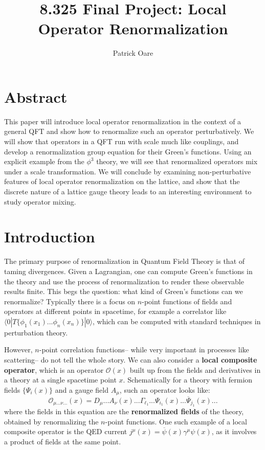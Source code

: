 \documentclass[11pt, oneside]{article}   	%
\title{8.325 Final Project: Local Operator Renormalization}
\author{Patrick Oare}
\date{}							%
\theoremstyle{definition}
\begin{document}
\maketitle

\thispagestyle{empty}

\section*{Abstract}

This paper will introduce local operator renormalization in the context of a general QFT and show how to renormalize 
such an operator perturbatively. We will show that operators in a QFT run with scale much like couplings, and develop 
a renormalization group equation for their Green's functions. Using an explicit example from the $\phi^3$ theory, 
we will see that renormalized operators mix under a scale transformation. We will conclude by examining non-perturbative features of local operator 
renormalization on the lattice, and show that the discrete nature of a lattice gauge theory leads to an interesting environment 
to study operator mixing. 

\newpage
\setcounter{page}{1}

\section{Introduction}

The primary purpose of renormalization in Quantum Field Theory is that of taming divergences. Given a Lagrangian, one 
can compute Green's functions in the theory and use the process of renormalization to render these observable results 
finite. This begs the question: what kind of Green's functions can we renormalize? Typically there is a focus on $n$-point 
functions of fields and operators at different points in spacetime, for example a correlator like $\langle 0 | 
T\{\phi_1(x_1) ... \phi_n(x_n)\} | 0\rangle$, which can be computed with standard techniques in perturbation theory. 

However, $n$-point correlation functions-- while very important in processes like scattering-- do not tell the whole story. 
We can also consider a \textbf{local composite operator}, which is an operator $\mathcal O(x)$ built up from the fields 
and derivatives in a theory at a single spacetime point $x$. Schematically for a theory with fermion fields $\{\Psi_i(x)\}$ 
and a gauge field $A_\mu$, such an operator looks like:
\begin{equation}
	\mathcal O_{\mu...\nu ... }(x) = D_{\mu}... A_{\nu}(x) ... \Gamma_{\ell_1} ... \Psi_{i_1}(x) ... 
	\overline \Psi_{j_1}(x) ...
\end{equation}
where the fields in this equation are the \textbf{renormalized fields} of the theory, obtained by renormalizing the 
$n$-point functions. One such example of a local composite operator is the QED current $j^\mu(x) = \overline\psi (x)
\gamma^\mu \psi(x)$, as it involves a product of fields at the same point. 
\end{document}
